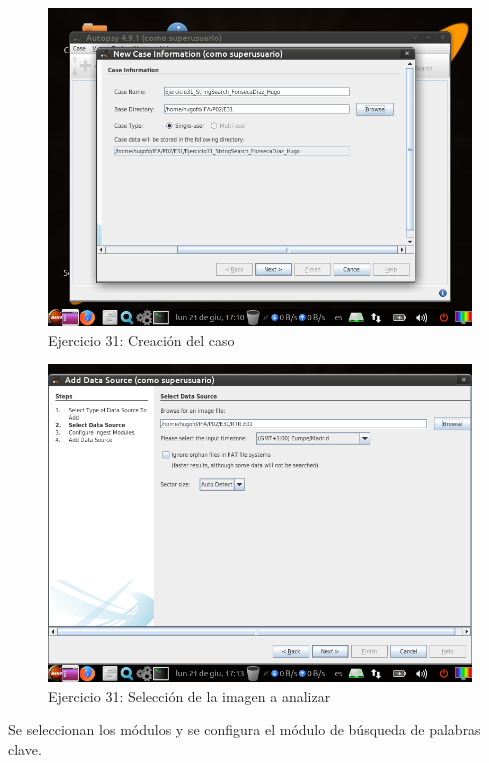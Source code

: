\documentclass[11pt]{article}
\begin{document}
\begin{figure}[H]
    \caption{Ejercicio 31: Creación del caso}
  \centering
  \includegraphics[scale=0.7]{p02/e31-1.png}
\end{figure}

\begin{figure}[H]
    \caption{Ejercicio 31: Selección de la imagen a analizar}
  \centering
  \includegraphics[scale=0.7]{p02/e31-2.png}
\end{figure}

Se seleccionan los módulos y se configura el módulo de búsqueda de palabras clave.
\end{document}
